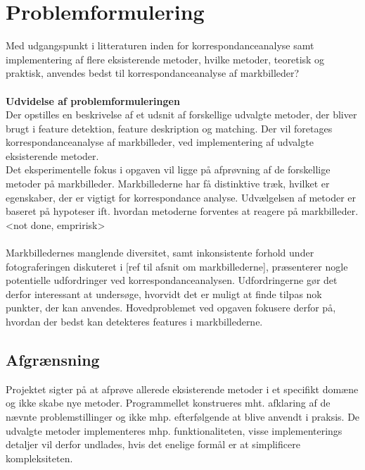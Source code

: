 \section{Problemformulering} \label{subsec:form}
Med udgangspunkt i litteraturen inden for
korrespondanceanalyse samt implementering af
flere eksisterende metoder, hvilke metoder, teoretisk og praktisk, anvendes bedst til korrespondanceanalyse af markbilleder? \\ \\
\textbf{Udvidelse af problemformuleringen} \\
Der opstilles en beskrivelse af et udsnit af forskellige udvalgte metoder, der bliver brugt i feature detektion, feature deskription og matching. Der vil foretages korrespondanceanalyse af markbilleder, ved implementering af udvalgte eksisterende metoder. \\
Det eksperimentelle fokus i opgaven vil ligge på afprøvning af de forskellige metoder på markbilleder. Markbillederne har få distinktive træk, hvilket er egenskaber, der er vigtigt for korrespondance analyse. Udvælgelsen af metoder er baseret på hypoteser  ift. hvordan metoderne forventes at reagere på markbilleder. 
<not done, empririsk>
\\ \\
Markbilledernes manglende diversitet, samt inkonsistente forhold under fotograferingen diskuteret i [ref til afsnit om markbillederne], præsenterer nogle potentielle udfordringer ved korrespondanceanalysen. Udfordringerne gør det derfor interessant at undersøge, hvorvidt det er muligt at finde tilpas nok punkter, der kan anvendes. Hovedproblemet ved opgaven fokusere derfor på, hvordan der bedst kan detekteres features i markbillederne.
\subsection{Afgrænsning} \label{subsec:afg}
Projektet sigter på at afprøve allerede eksisterende metoder i et specifikt domæne og ikke
skabe nye metoder. Programmellet konstrueres mht. afklaring af de nævnte problemstillinger
og ikke mhp. efterfølgende at blive anvendt i praksis. De udvalgte metoder implementeres mhp. funktionaliteten, visse implementerings detaljer vil derfor undlades, hvis det enelige formål er at simplificere kompleksiteten.